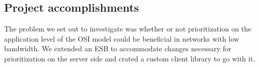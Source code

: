 \subsection{Project accomplishments}\label{Project accomplishments}
	The problem we set out to investigate was whether or not prioritization on the application level of the OSI model could be beneficial in networks with low bandwidth. We extended an ESB to accommodate changes necessary for prioritization on the server side and crated a custom client library to go with it.
	
		
